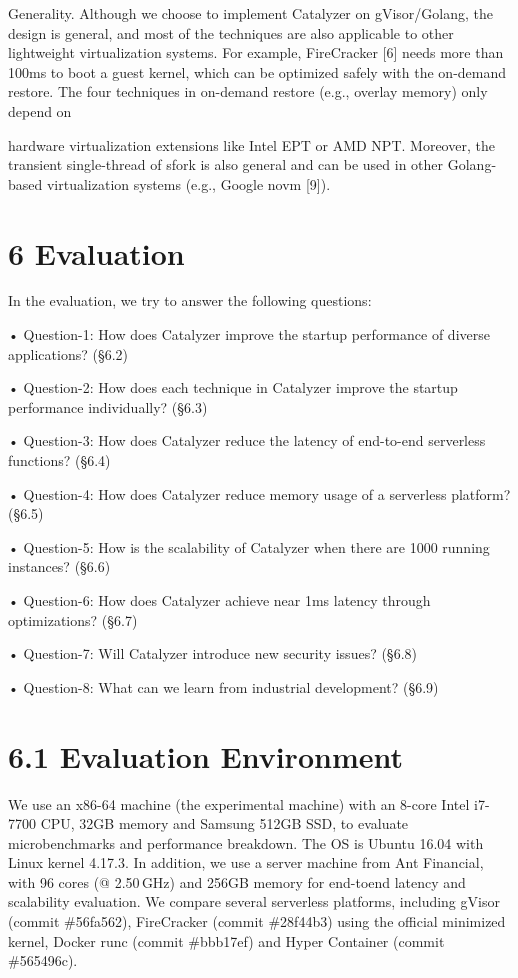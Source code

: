 \documentclass[
  10
]{article}
\begin{document}
Generality. Although we choose to implement Catalyzer on gVisor/Golang,
the design is general, and most of the techniques are also applicable to
other lightweight virtualization systems. For example, FireCracker
{[}6{]} needs more than 100ms to boot a guest kernel, which can be
optimized safely with the on-demand restore. The four techniques in
on-demand restore (e.g., overlay memory) only depend on

hardware virtualization extensions like Intel EPT or AMD NPT. Moreover,
the transient single-thread of sfork is also general and can be used in
other Golang-based virtualization systems (e.g., Google novm {[}9{]}).

\section{6 Evaluation}\label{evaluation}

In the evaluation, we try to answer the following questions:

• Question-1: How does Catalyzer improve the startup performance of
diverse applications? (§6.2)

• Question-2: How does each technique in Catalyzer improve the startup
performance individually? (§6.3)

• Question-3: How does Catalyzer reduce the latency of end-to-end
serverless functions? (§6.4)

• Question-4: How does Catalyzer reduce memory usage of a serverless
platform? (§6.5)

• Question-5: How is the scalability of Catalyzer when there are 1000
running instances? (§6.6)

• Question-6: How does Catalyzer achieve near 1ms latency through
optimizations? (§6.7)

• Question-7: Will Catalyzer introduce new security issues? (§6.8)

• Question-8: What can we learn from industrial development? (§6.9)

\section{6.1 Evaluation Environment}\label{evaluation-environment}

We use an x86-64 machine (the experimental machine) with an 8-core Intel
i7-7700 CPU, 32GB memory and Samsung 512GB SSD, to evaluate
microbenchmarks and performance breakdown. The OS is Ubuntu 16.04 with
Linux kernel 4.17.3. In addition, we use a server machine from Ant
Financial, with 96 cores (@ 2.50\,GHz) and
256GB memory for end-toend latency and scalability evaluation. We
compare several serverless platforms, including gVisor (commit
\#56fa562), FireCracker (commit \#28f44b3) using the official minimized
kernel, Docker runc (commit \#bbb17ef) and Hyper Container (commit
\#565496c).
\end{document}
